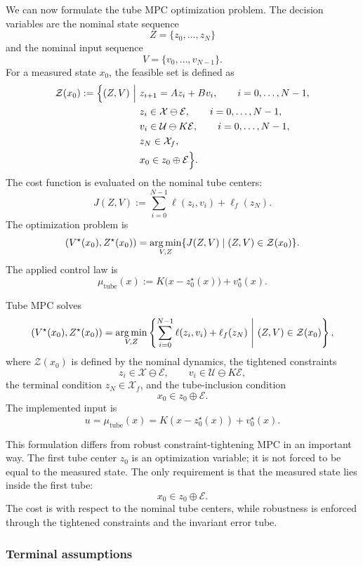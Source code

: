 We can now formulate the tube MPC optimization problem. The decision variables are the nominal
state sequence
\[
    Z=\{z_0,\ldots,z_N\}
\]
and the nominal input sequence
\[
    V=\{v_0,\ldots,v_{N-1}\}.
\]
For a measured state \(x_0\), the feasible set is defined as
\[
\begin{aligned}
    \mathcal Z(x_0)
    :=
    \Bigl\{(Z,V)\ \Big|\ 
    &
    z_{i+1}=Az_i+Bv_i,
    \qquad i=0,\ldots,N-1,
    \\
    &
    z_i\in\mathcal X\ominus\mathcal E,
    \qquad i=0,\ldots,N-1,
    \\
    &
    v_i\in\mathcal U\ominus K\mathcal E,
    \qquad i=0,\ldots,N-1,
    \\
    &
    z_N\in\mathcal X_f,
    \\
    &
    x_0\in z_0\oplus\mathcal E
    \Bigr\}.
\end{aligned}
\]
The cost function is evaluated on the nominal tube centers:
\[
    J(Z,V)
    :=
    \sum_{i=0}^{N-1}\ell(z_i,v_i)+\ell_f(z_N).
\]
The optimization problem is
\[
    (V^\star(x_0),Z^\star(x_0))
    =
    \operatorname*{arg\,min}_{V,Z}
    \{J(Z,V)\mid (Z,V)\in\mathcal Z(x_0)\}.
\]
The applied control law is
\[
    \mu_{\mathrm{tube}}(x)
    :=
    K\bigl(x-z_0^\star(x)\bigr)+v_0^\star(x).
\]

\begin{theorembox}
Tube MPC solves
\[
    (V^\star(x_0),Z^\star(x_0))
    =
    \argmin_{V,Z}
    \left\{
    \sum_{i=0}^{N-1}\ell(z_i,v_i)+\ell_f(z_N)
    \ \middle|\ 
    (Z,V)\in\mathcal Z(x_0)
    \right\},
\]
where \(\mathcal Z(x_0)\) is defined by the nominal dynamics, the tightened constraints
\[
    z_i\in\mathcal X\ominus\mathcal E,
    \qquad
    v_i\in\mathcal U\ominus K\mathcal E,
\]
the terminal condition \(z_N\in\mathcal X_f\), and the tube-inclusion condition
\[
    x_0\in z_0\oplus\mathcal E.
\]
The implemented input is
\[
    u=\mu_{\mathrm{tube}}(x)
    =
    K(x-z_0^\star(x))+v_0^\star(x).
\]
\end{theorembox}

This formulation differs from robust constraint-tightening MPC in an important way. The first
tube center \(z_0\) is an optimization variable; it is not forced to be equal to the measured state.
The only requirement is that the measured state lies inside the first tube:
\[
    x_0\in z_0\oplus\mathcal E.
\]
The cost is with respect to the nominal tube centers, while robustness is enforced through the
tightened constraints and the invariant error tube.

\subsubsection{Terminal assumptions}

